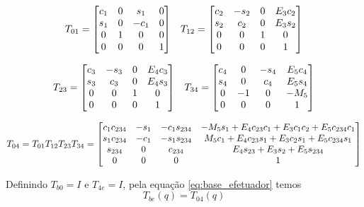 
\begin{align*}
{T}_{01} = 
\begin{bmatrix}c_1 & 0 & s_1 &  0 \\
   s_1 & 0 & -c_1 & 0 \\
   0   & 1 &    0 & 0 \\
   0   & 0 &    0 & 1\end{bmatrix}
& &
{T}_{12} =  \begin{bmatrix}c_2 & -s_2 &  0 & E_3 c_2 \\
   s_2 &  c_2 &  0 & E_3 s_2  \\
   0   &    0 &  1 & 	   0  \\
   0   &    0 &  0 &       1\end{bmatrix} 
\end{align*}

\begin{align*}
{T}_{23} = 
\begin{bmatrix}c_3 & -s_3 &  0 & E_4 c_3 \\
   s_3 &  c_3 &  0 & E_4 s_3  \\
   0   &    0 &  1 & 	   0  \\
   0   &    0 &  0 &       1\end{bmatrix}
& &
{T}_{34} = 
\begin{bmatrix}c_4 &    0 &  -s_4 & E_5 c_4 \\
   s_4 &    0 &   c_4 & E_5 s_4 \\
   0   &   -1 &     0 & 	-M_5 \\
   0   &    0 &     0 &       1\end{bmatrix}
\end{align*}


\begin{equation} \label{eq:cine_direta}
{T}_{04} = {T}_{01} {T}_{12}  {T}_{23} {T}_{34} = 
\begin{bmatrix}
   c_1 c_{234} & -s_1 & -c_1 s_{234} & -M_5 s_1 + E_4 c_{23}c_1 + E_3 c_1 c_2 + E_5 c_{234} c_1 \\
   s_1 c_{234} & -c_1 & -s_1 s_{234} &   M_5 c_1+E_4 c_{23} s_1 + E_3 c_2 s_1 + E_5 c_{234} s_1 \\
   s_{234}     &    0 &      c_{234} &					     E_4 s_{23} + E_3 s_2 + E_5 s_{234} \\
   0   &    0 &     0 &      												   1
\end{bmatrix} 
\end{equation}

Definindo ${T}_{b0} = {I}$ e ${T}_{4e} = {I}$, pela equação \eqref{eq:base_efetuador} temos
\begin{equation}
{T}_{be} ({q}) = {T}_{04}({q})
\end{equation}


